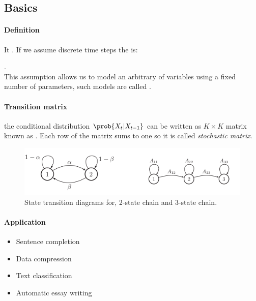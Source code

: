 \subsection{Basics}
\paragraph{Definition}
It .
If we assume discrete time steps the  is:
\begin{center}
\end{center}
.\\
This assumption allows us to model an arbitrary of variables using a fixed number of parameters, such
models are called .

\paragraph{Transition matrix}
 the conditional distribution $\prob{X_{t}|X_{t-1}}$ can be written as 
$K\times K$ matrix known as . Each row of the matrix sums to one
 so it is called \emph{stochastic matrix}.
\begin{figure}[H]
    \begin{center}
        \includegraphics[width=.5\textwidth]{./chapters/2_statistics/07_hidden_markov_models/1_images/1_state_transition_diagrams.png}
    \end{center}
    \caption{State transition diagrams for, 2-state chain and 3-state chain.}
    \label{fig:1_state_transition_diagrams}
\end{figure}

\paragraph{Application}
\begin{itemize}
    \item Sentence completion
    \item Data compression
    \item Text classification
    \item Automatic essay writing
\end{itemize}


